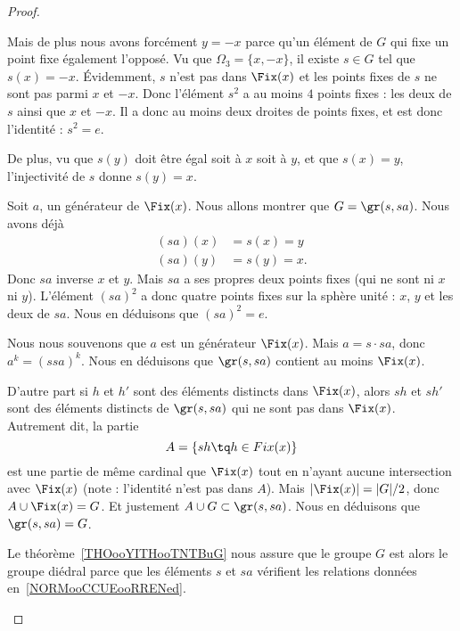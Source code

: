 \begin{proof}
\begin{subproof}
		Mais de plus nous avons forcément \( y=-x\) parce qu'un élément de \( G\) qui fixe un point fixe également l'opposé. Vu que \( \Omega_3=\{ x,-x \}\), il existe \( s\in G\) tel que \( s(x)=-x\). Évidemment, \( s\) n'est pas dans \( \Fix(x)\) et les points fixes de \( s\) ne sont pas parmi \( x\) et \( -x\). Donc l'élément \( s^2\) a au moins \( 4\) points fixes : les deux de \( s\) ainsi que \( x\) et \( -x\). Il a donc au moins deux droites de points fixes, et est donc l'identité : \( s^2=e\).

		De plus, vu que \( s(y)\) doit être égal soit à \( x\) soit à \( y\), et que \( s(x)=y\), l'injectivité de \( s\) donne \( s(y)=x\).

		Soit \( a\), un générateur de \( \Fix(x)\). Nous allons montrer que \( G=\gr(s,sa)\). Nous avons déjà
		\begin{subequations}
			\begin{align}
				(sa)(x) & =s(x)=y  \\
				(sa)(y) & =s(y)=x.
			\end{align}
		\end{subequations}
		Donc \( sa\) inverse \( x\) et \( y\). Mais \( sa\) a ses propres deux points fixes (qui ne sont ni \( x\) ni \( y\)). L'élément \( (sa)^2\) a donc quatre points fixes sur la sphère unité : \( x\), \( y\) et les deux de \( sa\). Nous en déduisons que \( (sa)^2=e\).

		Nous nous souvenons que \( a\) est un générateur \( \Fix(x)\). Mais \( a=s\cdot sa\), donc \( a^k=(ssa)^k\). Nous en déduisons que \( \gr(s,sa)\) contient au moins \( \Fix(x)\).

		D'autre part si \( h\) et \( h'\) sont des éléments distincts dans \( \Fix(x)\), alors \( sh\) et \( sh'\) sont des éléments distincts de \( \gr(s,sa)\) qui ne sont pas dans \( \Fix(x)\). Autrement dit, la partie
		\begin{equation}
			A=\{ sh\tq h\in Fix(x) \}
		\end{equation}
		est une partie de même cardinal que \( \Fix(x)\) tout en n'ayant aucune intersection avec \( \Fix(x)\) (note : l'identité n'est pas dans \( A\)). Mais \( | \Fix(x) |=| G |/2\), donc \( A\cup\Fix(x)=G\). Et justement \( A\cup G\subset \gr(s,sa)\). Nous en déduisons que \( \gr(s,sa)=G\).

		Le théorème~\ref{THOooYITHooTNTBuG} nous assure que le groupe \( G\) est alors le groupe diédral parce que les éléments \( s\) et \( sa\) vérifient les relations données en~\ref{NORMooCCUEooRRENed}.


\end{subproof}
\end{proof}
